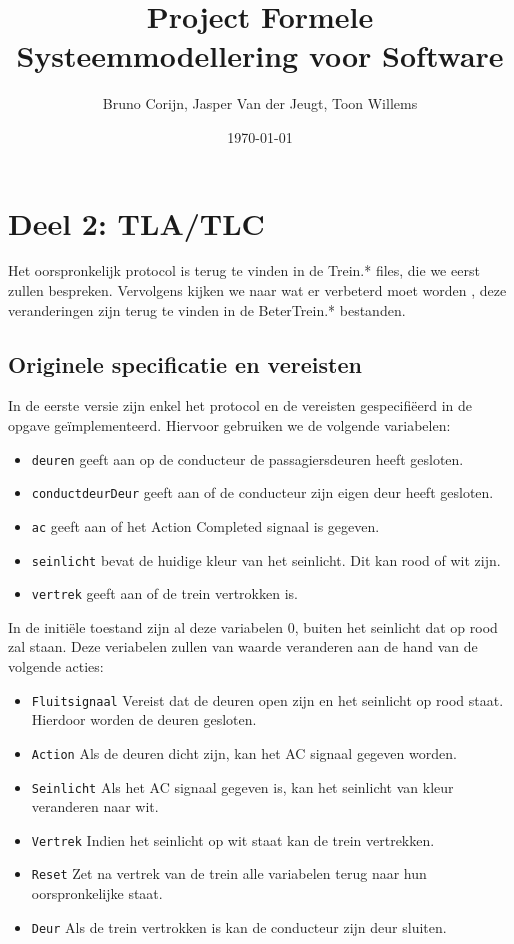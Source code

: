 \documentclass[a4paper,10pt]{article}
\title{Project Formele Systeemmodellering voor Software}
\author{Bruno Corijn, Jasper Van der Jeugt, Toon Willems}
\date{\today}
\begin{document}
\maketitle

\section{Deel 2: TLA/TLC}

Het oorspronkelijk protocol is terug te vinden in de Trein.* files, die we
eerst zullen bespreken. Vervolgens kijken we naar wat er verbeterd moet worden
, deze veranderingen zijn terug te vinden in de BeterTrein.* bestanden.

\subsection{Originele specificatie en vereisten}

In de eerste versie zijn enkel het protocol en de vereisten gespecifi\"eerd in de
opgave ge\"implementeerd. Hiervoor gebruiken we de volgende variabelen:
\begin{itemize}
    \item \texttt{deuren} geeft aan op de conducteur de passagiersdeuren heeft
    gesloten.
    \item \texttt{conductdeurDeur} geeft aan of de conducteur zijn eigen deur
    heeft gesloten.
    \item \texttt{ac} geeft aan of het Action Completed signaal is gegeven.
    \item \texttt{seinlicht} bevat de huidige kleur van het seinlicht. Dit kan
    rood of wit zijn.
    \item \texttt{vertrek} geeft aan of de trein vertrokken is.
\end{itemize}

In de initi\"ele toestand zijn al deze variabelen 0, buiten het seinlicht dat op
rood zal staan. Deze veriabelen zullen van waarde veranderen aan de hand van de
volgende acties:
\begin{itemize}
    \item \texttt{Fluitsignaal} Vereist dat de deuren open zijn en het seinlicht
    op rood staat. Hierdoor worden de deuren gesloten.
    \item \texttt{Action} Als de deuren dicht zijn, kan het AC signaal gegeven
    worden.
    \item \texttt{Seinlicht} Als het AC signaal gegeven is, kan het seinlicht van
    kleur veranderen naar wit.
    \item \texttt{Vertrek} Indien het seinlicht op wit staat kan de trein
    vertrekken.
    \item \texttt{Reset} Zet na vertrek van de trein alle variabelen terug naar
    hun oorspronkelijke staat.
    \item \texttt{Deur} Als de trein vertrokken is kan de conducteur zijn deur
    sluiten.
\end{itemize}
\end{document}
